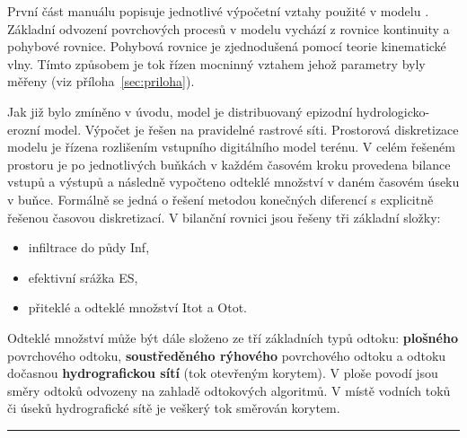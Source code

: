 %

První část manuálu popisuje jednotlivé výpočetní vztahy použité v modelu \smod. Základní odvození povrchových procesů v modelu \smod vychází z rovnice kontinuity a pohybové rovnice. Pohybová rovnice je zjednodušená pomocí teorie kinematické vlny. Tímto způsobem je tok řízen mocninný vztahem jehož parametry byly měřeny (viz  příloha~\ref{sec:priloha}). 

Jak již bylo zmíněno v úvodu, model \smod je distribuovaný epizodní hydrologicko-erozní model. Výpočet je řešen na pravidelné rastrové síti. Prostorová diskretizace modelu je řízena  rozlišením vstupního digitálního model terénu. V celém řešeném prostoru je po jednotlivých buňkách v každém časovém kroku provedena bilance vstupů a výstupů a následně vypočteno odteklé množství v daném časovém úseku v buňce. Formálně se jedná o řešení metodou konečných diferencí s explicitně řešenou časovou diskretizací. V bilanční rovnici jsou řešeny tři základní složky:


\begin{itemize}\itemsep 0cm
\item infiltrace do půdy \acs{Inf},
\item efektivní srážka \acs{ES},
\item přiteklé a odteklé množství \acs{Itot} a \acs{Otot}.
\end{itemize}


Odteklé množství může být dále složeno ze tří základních typů odtoku: \textbf{plošného} povrchového odtoku, \textbf{soustředěného rýhového} povrchového odtoku a odtoku dočasnou \textbf{hydrografickou sítí} (tok otevřeným korytem). V ploše povodí jsou směry odtoků odvozeny na zahladě odtokových algoritmů. V místě vodních toků či úseků hydrografické sítě je veškerý tok směrován korytem.\\
% 
% 
\rule{\textwidth}{0.3pt}




